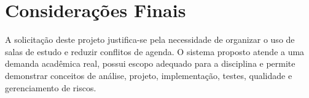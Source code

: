 \documentclass[12pt,a4paper]{article}
\begin{document}
\section{Considerações Finais}

A solicitação deste projeto justifica-se pela necessidade de organizar o uso de salas de estudo e reduzir conflitos de agenda. O sistema proposto atende a uma demanda acadêmica real, possui escopo adequado para a disciplina e permite demonstrar conceitos de análise, projeto, implementação, testes, qualidade e gerenciamento de riscos.
\end{document}
